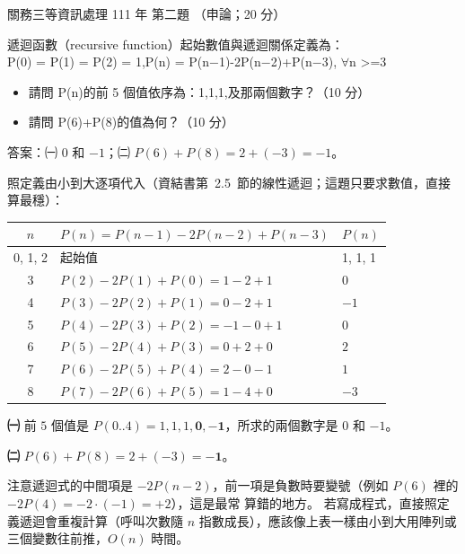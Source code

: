 \begin{pastexam}[label={px:gw3-111-ds-02}]{關務三等資訊處理 111 年 第二題}
（申論；20 分）

遞迴函數（recursive function）起始數值與遞迴關係定義為：\\
P(0) = P(1) = P(2) = 1,P(n) = P(n$-$1)-2P(n$-$2)+P(n$-$3), $\forall$n >=3
\begin{itemize}[leftmargin=2.2em]
\item[㈠] 請問 P(n)的前 5 個值依序為：1,1,1,及那兩個數字？（10 分）
\item[㈡] 請問 P(6)+P(8)的值為何？（10 分）
\end{itemize}
\end{pastexam}

\begin{pastsoln}
答案：㈠ $0$ 和 $-1$；㈡ $P(6) + P(8) = 2 + (-3) = -1$。

照定義由小到大逐項代入（資結書第~2.5~節的線性遞迴；這題只要求數值，直接算最穩）：
\begin{center}
\small
\begin{tabular}{cll}
\toprule
$n$ & $P(n) = P(n-1) - 2P(n-2) + P(n-3)$ & $P(n)$ \\
\midrule
0, 1, 2 & 起始值 & 1, 1, 1 \\
3 & $P(2) - 2P(1) + P(0) = 1 - 2 + 1$ & $0$ \\
4 & $P(3) - 2P(2) + P(1) = 0 - 2 + 1$ & $-1$ \\
5 & $P(4) - 2P(3) + P(2) = -1 - 0 + 1$ & $0$ \\
6 & $P(5) - 2P(4) + P(3) = 0 + 2 + 0$ & $2$ \\
7 & $P(6) - 2P(5) + P(4) = 2 - 0 - 1$ & $1$ \\
8 & $P(7) - 2P(6) + P(5) = 1 - 4 + 0$ & $-3$ \\
\bottomrule
\end{tabular}
\end{center}

\textbf{㈠} 前 $5$ 個值是 $P(0..4) = 1, 1, 1, \mathbf{0}, \mathbf{-1}$，所求的兩個數字是 $0$ 和 $-1$。

\textbf{㈡} $P(6) + P(8) = 2 + (-3) = \mathbf{-1}$。

注意遞迴式的中間項是 $-2P(n-2)$，前一項是負數時要變號（例如 $P(6)$ 裡的 $-2P(4) = -2 \cdot (-1) = +2$），這是最常
算錯的地方。 若寫成程式，直接照定義遞迴會重複計算（呼叫次數隨 $n$ 指數成長），應該像上表一樣由小到大用陣列或
三個變數往前推，$O(n)$ 時間。
\end{pastsoln}
